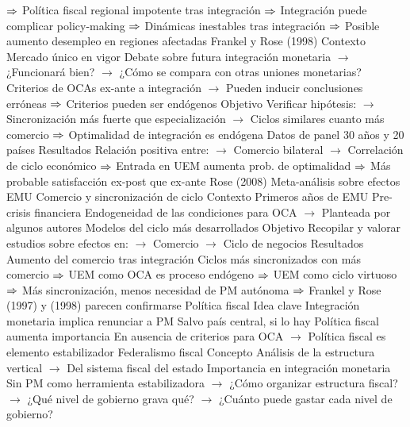\documentclass{nuevotema}
\begin{document}
\begin{esquemal}
				\4[] $\Rightarrow$ Política fiscal regional impotente tras integración
				\4[] $\Rightarrow$ Integración puede complicar policy-making
				\4[] $\Rightarrow$ Dinámicas inestables tras integración
				\4[] $\Rightarrow$ Posible aumento desempleo en regiones afectadas
			\3 Frankel y Rose (1998)
				\4 Contexto
				\4[] Mercado único en vigor
				\4[] Debate sobre futura integración monetaria
				\4[] $\to$ ¿Funcionará bien?
				\4[] $\to$ ¿Cómo se compara con otras uniones monetarias?
				\4[] Criterios de OCAs ex-ante a integración
				\4[] $\to$ Pueden inducir conclusiones erróneas
				\4[] $\Rightarrow$ Criterios pueden ser endógenos
				\4 Objetivo
				\4[] Verificar hipótesis:
				\4[] $\to$ Sincronización más fuerte que especialización
				\4[] $\to$ Ciclos similares cuanto más comercio
				\4[] $\Rightarrow$ Optimalidad de integración es endógena
				\4[] Datos de panel 30 años y 20 países
				\4 Resultados
				\4[] Relación positiva entre:
				\4[] $\to$ Comercio bilateral
				\4[] $\to$ Correlación de ciclo económico
				\4[] $\Rightarrow$ Entrada en UEM aumenta prob. de optimalidad
				\4[] $\Rightarrow$ Más probable satisfacción ex-post que ex-ante
			\3 Rose (2008)
				\4 Meta-análisis sobre efectos EMU
				\4[] Comercio y sincronización de ciclo
				\4 Contexto
				\4[] Primeros años de EMU
				\4[] Pre-crisis financiera
				\4[] Endogeneidad de las condiciones para OCA
				\4[] $\to$ Planteada por algunos autores
				\4[] Modelos del ciclo más desarrollados
				\4 Objetivo
				\4[] Recopilar y valorar estudios sobre efectos en:
				\4[] $\to$ Comercio
				\4[] $\to$ Ciclo de negocios
				\4 Resultados
				\4[] Aumento del comercio tras integración
				\4[] Ciclos más sincronizados con más comercio
				\4[] $\Rightarrow$ UEM como OCA es proceso endógeno
				\4[] $\Rightarrow$ UEM como ciclo virtuoso
				\4[] $\Rightarrow$ Más sincronización, menos necesidad de PM autónoma
				\4[] $\Rightarrow$ Frankel y Rose (1997) y (1998) parecen confirmarse
	\1 
		\2 Política fiscal
			\3 Idea clave
				\4 Integración monetaria implica renunciar a PM
				\4[] Salvo país central, si lo hay
				\4 Política fiscal aumenta importancia
				\4[] En ausencia de criterios para OCA
				\4[] $\to$ Política fiscal es elemento estabilizador
			\3 Federalismo fiscal
				\4 Concepto
				\4[] Análisis de la estructura vertical
				\4[] $\to$ Del sistema fiscal del estado
				\4 Importancia en integración monetaria
				\4[] Sin PM como herramienta estabilizadora
				\4[] $\to$ ¿Cómo organizar estructura fiscal?
				\4[] $\to$ ¿Qué nivel de gobierno grava qué?
				\4[] $\to$ ¿Cuánto puede gastar cada nivel de gobierno?

\end{esquemal}
\end{document}
